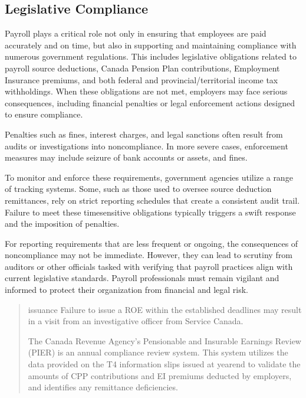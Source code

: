 \documentclass[letterpaper,10pt,english]{sphinxmanual}
\begin{document}
\subsection{Legislative Compliance}
\label{\detokenize{compliance:legislative-compliance}}
\sphinxAtStartPar
Payroll plays a critical role not only in ensuring that employees are paid accurately and on time, but also in
supporting and maintaining compliance with numerous government regulations. This includes legislative obligations related to
payroll source deductions, Canada Pension Plan contributions, Employment Insurance premiums, and both federal and
provincial/territorial income tax withholdings. When these obligations are not met, employers may face serious consequences,
including financial penalties or legal enforcement actions designed to ensure compliance.

\sphinxAtStartPar
Penalties such as fines, interest charges, and legal sanctions often result from audits or investigations into
non\sphinxhyphen{}compliance. In more severe cases, enforcement measures may include seizure of bank accounts or assets, and fines.

\sphinxAtStartPar
To monitor and enforce these requirements, government agencies utilize a range of tracking systems. Some, such as those
used to oversee source deduction remittances, rely on strict reporting schedules that create a consistent audit trail.
Failure to meet these time\sphinxhyphen{}sensitive obligations typically triggers a swift response and the imposition of penalties.

\sphinxAtStartPar
For reporting requirements that are less frequent or ongoing, the consequences of non\sphinxhyphen{}compliance may not be immediate.
However, they can lead to scrutiny from auditors or other officials tasked with verifying that payroll practices align with
current legislative standards. Payroll professionals must remain vigilant and informed to protect their organization from
financial and legal risk.
\begin{quote}

\sphinxAtStartPar
{}

\sphinxAtStartPar
{} issuance
Failure to issue a ROE within the established deadlines may result in a visit from an investigative officer from Service Canada.

\sphinxAtStartPar
The Canada Revenue Agency’s Pensionable and Insurable Earnings Review (PIER) is an annual compliance review system. This system utilizes the data provided on the T4
information slips issued at year\sphinxhyphen{}end to validate the amounts of CPP contributions and EI premiums deducted by employers, and identifies any remittance deficiencies.
\end{quote}
\end{document}
